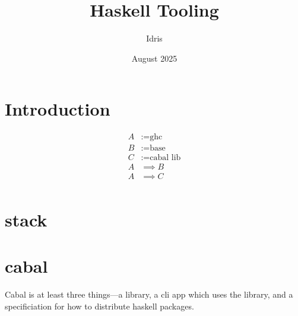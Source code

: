 \documentclass[openany, 12pt]{book}
\title{Haskell Tooling}
\author{Idris}
\date{August 2025}
\begin{document}
\tableofcontents

\chapter{Introduction}





\begin{align*}
	A & :=\text{ghc}       \\
	B & :=\text{base}      \\
	C & :=\text{cabal lib} \\
	A & \implies B         \\
	A & \implies C         \\
\end{align*}

\chapter{stack}

\chapter{cabal}
Cabal is at least three things---a library, a cli app which uses the library,
and a specificiation for how to distribute haskell packages.
\end{document}
